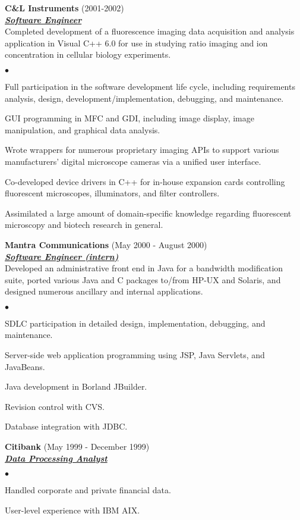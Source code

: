 \documentclass{article}
\newcommand{\employer}[3]{{ \textbf{#1} (#2)\\ \underline{\textbf{\emph{#3}}}\\  }}
\newenvironment{achievements}{\begin{list}{$\bullet$}{\topsep 0pt \itemsep
      -2pt}}{\vspace*{4pt}\end{list}}
\begin{document}
\employer{C\&L Instruments}{2001-2002}{Software Engineer} Completed development
of a fluorescence imaging data acquisition and analysis application in Visual
C++ 6.0 for use in studying ratio imaging and ion concentration in cellular
biology experiments.
\begin{achievements}
\item Full participation in the software development life cycle, including
  requirements analysis, design, development/implementation, debugging, and
  maintenance.
\item GUI programming in MFC and GDI, including image display, image
  manipulation, and graphical data analysis.
\item Wrote wrappers for numerous proprietary imaging APIs to support various
  manufacturers' digital microscope cameras via a unified user interface.
\item Co-developed device drivers in C++ for in-house expansion cards
  controlling fluorescent microscopes, illuminators, and filter controllers.
\item Assimilated a large amount of domain-specific knowledge regarding
  fluorescent microscopy and biotech research in general.
\end{achievements}

\employer{Mantra Communications}{May 2000 - August 2000}{Software Engineer
  (intern)} Developed an administrative front end in Java for a bandwidth
modification suite, ported various Java and C packages to/from HP-UX and
Solaris, and designed numerous ancillary and internal applications.
\begin{achievements}
\item SDLC participation in detailed design, implementation, debugging, and
  maintenance.
\item Server-side web application programming using JSP, Java Servlets, and
  JavaBeans.
\item Java development in Borland JBuilder.
\item Revision control with CVS.
\item Database integration with JDBC.
\end{achievements}

\employer{Citibank}{May 1999 - December 1999}{Data Processing Analyst}
\begin{achievements}
\item Handled corporate and private financial data.
\item User-level experience with IBM AIX.
\end{achievements}
\end{document}
